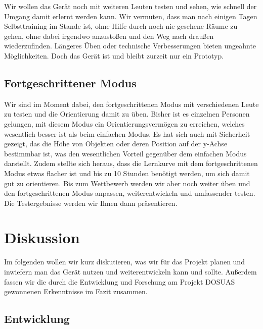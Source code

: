 \documentclass[a4paper,12pt,ngerman]{scrartcl}
\begin{document}
Wir wollen das Gerät noch mit
weiteren Leuten testen und sehen, wie schnell der Umgang damit erlernt werden kann. Wir vermuten, dass man nach einigen 
Tagen Selbsttraining im Stande ist, ohne Hilfe durch noch nie gesehene Räume zu gehen, ohne dabei irgendwo anzustoßen und
den Weg nach draußen wiederzufinden. Längeres Üben oder technische Verbesserungen bieten ungeahnte
Möglichkeiten. Doch das Gerät ist und bleibt zurzeit nur ein Prototyp. 

\subsection{Fortgeschrittener Modus}

Wir sind im Moment dabei, den fortgeschrittenen Modus mit verschiedenen Leute zu testen und die Orientierung damit zu üben. Bisher
ist es einzelnen Personen gelungen, mit diesem Modus ein Orientierungsvermögen zu erreichen, welches wesentlich besser ist als
beim einfachen Modus. Es hat sich auch mit Sicherheit gezeigt, das die Höhe von Objekten oder deren Position auf der
y-Achse bestimmbar ist, was den wesentlichen Vorteil gegenüber dem einfachen Modus darstellt. Zudem stellte sich heraus, dass die Lernkurve mit
dem fortgeschrittenen Modus etwas flacher ist und bis zu 10 Stunden benötigt werden, um sich damit gut zu orientieren.
Bis zum Wettbewerb werden wir aber noch weiter üben und den fortgeschrittenen Modus anpassen, weiterentwickeln und
umfassender testen. Die Testergebnisse werden wir Ihnen dann präsentieren.

\newpage

\section{Diskussion}

Im folgenden wollen wir kurz diskutieren, was wir für das Projekt planen und inwiefern man das
Gerät nutzen und weiterentwickeln kann und sollte. Außerdem fassen wir die durch die Entwicklung und Forschung am Projekt DOSUAS gewonnenen Erkenntnisse im Fazit zusammen.

\subsection{Entwicklung}
\end{document}
